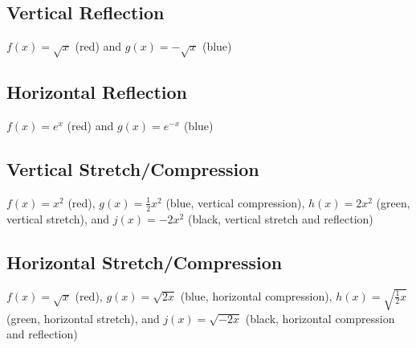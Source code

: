 
\subsection{Vertical Reflection}
\label{sss:vert-0225}

$f(x) = \sqrt{x}$ (red) and $g(x) = -\sqrt{x}$ (blue)


\subsection{Horizontal Reflection}
\label{sss:hori-6e98}

$f(x) = e^x$ (red) and $g(x) = e^{-x}$ (blue)


\subsection{Vertical Stretch/Compression}
\label{sss:vert-3d17}

$f(x) = x^2$ (red), $g(x) = \frac{1}{2}x^2$ (blue, vertical compression), $h(x) = 2x^2$ (green, vertical stretch), and $j(x) = -2x^2$ (black, vertical stretch and reflection)


\subsection{Horizontal Stretch/Compression}
\label{sss:hori-0121}

$f(x) = \sqrt{x}$ (red), $g(x) = \sqrt{2x}$ (blue, horizontal compression), $h(x) = \sqrt{\frac{1}{2}x}$ (green, horizontal stretch), and $j(x) = \sqrt{-2x}$ (black, horizontal compression and reflection)

